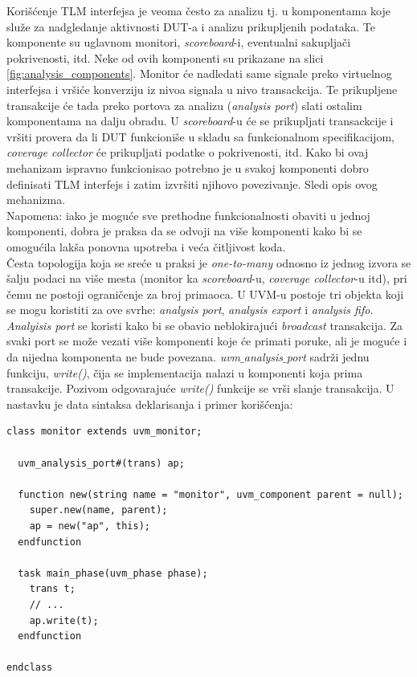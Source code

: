 Korišćenje TLM interfejsa je veoma često za analizu tj. u komponentama koje
služe za nadgledanje aktivnosti DUT-a i analizu prikupljenih podataka. Te
komponente su uglavnom monitori, \emph{scoreboard}-i, eventualni sakupljači
pokrivenosti, itd. Neke od ovih komponenti su prikazane na slici
\ref{fig:analysis_components}. Monitor će nadledati same signale preko
virtuelnog interfejsa i vršiće konverziju iz nivoa signala u nivo transackcija.
Te prikupljene transakcije će tada preko portova za analizu (\emph{analysis
  port}) slati ostalim komponentama na dalju obradu. U \emph{scoreboard}-u će se
prikupljati transackcije i vršiti provera da li DUT funkcioniše u skladu sa
funkcionalnom specifikacijom, \emph{coverage collector} će prikupljati podatke o
pokrivenosti, itd. Kako bi ovaj mehanizam ispravno funkcionisao potrebno je u
svakoj komponenti dobro definisati TLM interfejs i zatim izvršiti njihovo
povezivanje. Sledi opis ovog mehanizma.\\

Napomena: iako je moguće sve prethodne funkcionalnosti obaviti u jednoj
komponenti, dobra je praksa da se odvoji na više komponenti kako bi se omogućila
lakša ponovna upotreba i veća čitljivost koda.\\

Česta topologija koja se sreće u praksi je \emph{one-to-many} odnosno iz jednog
izvora se šalju podaci na više mesta (monitor ka \emph{scoreboard}-u,
\emph{coverage collector}-u itd), pri čemu ne postoji ograničenje za broj
primaoca. U UVM-u postoje tri objekta koji se mogu koristiti za ove svrhe:
\emph{analysis port}, \emph{analysis export} i \emph{analysis fifo}.\\

\emph{Analyisis port} se koristi kako bi se obavio neblokirajući
\emph{broadcast} transakcija. Za svaki port se može vezati više komponenti koje
će primati poruke, ali je moguće i da nijedna komponenta ne bude povezana.
\emph{uvm\(\_\)analysis\(\_\)port} sadrži jednu funkciju, \emph{write()}, čija
se implementacija nalazi u komponenti koja prima transakcije. Pozivom
odgovarajuće \emph{write()} funkcije se vrši slanje transakcija. U nastavku je
data sintaksa deklarisanja i primer korišćenja:

\begin{lstlisting}
class monitor extends uvm_monitor;

  uvm_analysis_port#(trans) ap;

  function new(string name = "monitor", uvm_component parent = null);
    super.new(name, parent);
    ap = new("ap", this);
  endfunction

  task main_phase(uvm_phase phase);
    trans t;
    // ...
    ap.write(t);
  endfunction

endclass
\end{lstlisting}

